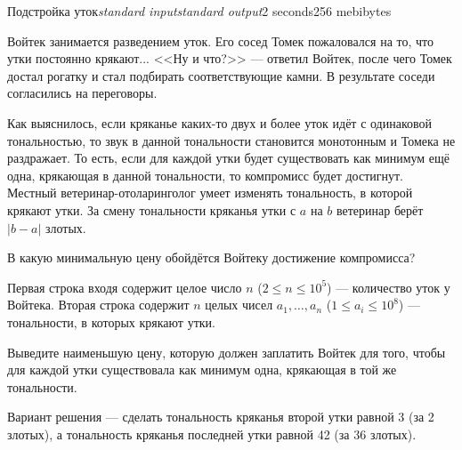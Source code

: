 \begin{problem}{Подстройка уток}{\textsl{standard input}}{\textsl{standard output}}{2 seconds}{256 mebibytes}{}

Войтек занимается разведением уток. Его сосед Томек пожаловался на то, что утки постоянно крякают... <<Ну и что?>> --- ответил Войтек,
после чего Томек достал рогатку и стал подбирать соответствующие камни. В результате соседи согласились на переговоры.

Как выяснилось, если кряканье каких-то двух и более уток идёт с одинаковой тональностью, то звук в данной тональности становится
монотонным и Томека не раздражает. То есть, если для каждой утки будет существовать как минимум ещё одна, крякающая в данной тональности,
то компромисс будет достигнут. Местный ветеринар-отоларинголог умеет изменять тональность, в которой крякают утки. За смену тональности
кряканья утки с $a$ на $b$ ветеринар берёт $|b-a|$ злотых.

В какую минимальную цену обойдётся Войтеку достижение компромисса?

\InputFile

Первая строка входя содержит целое число $n$ ($2 \leq n \leq 10^5$) --- количество уток у Войтека.
Вторая строка содержит $n$ целых чисел $a_1, \ldots, a_n$ ($1 \leq a_i \leq 10^8$) --- тональности, в которых крякают утки.

\OutputFile

Выведите наименьшую цену, которую должен заплатить Войтек для того, чтобы для каждой утки существовала как минимум одна, крякающая в той же
тональности.

\Examples
\begin{example}
%
\end{example}

\Note

Вариант решения --- сделать тональность кряканья второй утки равной 3 (за 2 злотых), а тональность кряканья последней утки равной 42 (за 36 злотых).

\end{problem}
